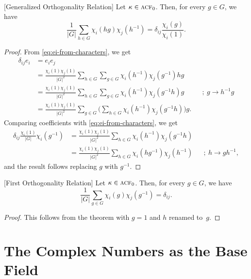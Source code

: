 \begin{thm}\label{thm:general-orthogonality}
    {\rm[Generalized Orthogonality Relation]}
    Let $\kappa\in\operatorname{\textnormal{\textsc{acf}}}_0$. Then, for every\/ $g \in G$, we have
    $$
        \frac1{|G|} \sum_{h\in G} \chi_i(hg)\chi_j(h^{-1})
        = \delta_{ij} \frac{\chi_i(g)}{\chi_i(1)}.
    $$
\end{thm}

\begin{proof} From \eqref{eq:ei-from-characters}, we get
    \begin{align*}
        \delta_{ij}e_i &= e_ie_j\\
            &= \frac{\chi_i(1)\chi_j(1)}{|G|^2}
                \sum_{h\in G}\sum_{g\in G}
                    \chi_i(h^{-1})\chi_j(g^{-1})hg\\
            &= \frac{\chi_i(1)\chi_j(1)}{|G|^2}
                \sum_{h\in G}\sum_{g\in G}
                    \chi_i(h^{-1})\chi_j(g^{-1}h)g
                        &&;\ g\to h^{-1}g\\
            &= \frac{\chi_i(1)\chi_j(1)}{|G|^2}
                \sum_{g\in G}\Big(\sum_{h\in G}
                    \chi_i(h^{-1})\chi_j(g^{-1}h)\Big)g.
    \end{align*}
    Comparing coefficients with \eqref{eq:ei-from-characters}, we get
    \begin{align*}
        \delta_{ij}\frac{\chi_i(1)}{|G|}\chi_i(g^{-1})
            &= \frac{\chi_i(1)\chi_j(1)}{|G|^2}
                \sum_{h\in G}\chi_i(h^{-1})\chi_j(g^{-1}h)\\
            &= \frac{\chi_i(1)\chi_j(1)}{|G|^2}
                \sum_{h\in G}\chi_i(hg^{-1})\chi_j(h^{-1})
                    &&;\ h\to gh^{-1},
    \end{align*}
    and the result follows replacing $g$ with $g^{-1}$.
\end{proof}

\begin{cor}\label{cor:first-orthogonality}
    {\rm[First Orthogonality Relation]}
    Let $\kappa\in\operatorname{\textnormal{\textsc{acf}}}_0$. Then, for every\/ $g \in G$, we have
    $$
        \frac1{|G|}\sum_{g\in G} \chi_i(g)\chi_j(g^{-1})
        = \delta_{ij}.
    $$
\end{cor}

\begin{proof}
    This follows from the theorem with $g=1$ and $h$ renamed to~$g$.
\end{proof}

\section{The Complex Numbers as the Base Field}

